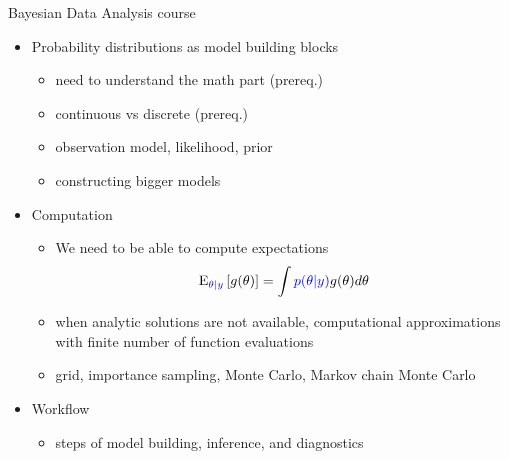\documentclass[english,t]{beamer}
\newcommand{\E}{\mathrm{E}}
\begin{document}
\begin{frame}{Bayesian Data Analysis course}

  \begin{itemize}
  \item Probability distributions as model building blocks
    \begin{itemize}
    \item need to understand the math part (prereq.)
    \item continuous vs discrete (prereq.)
    \item observation model, likelihood, prior
    \item constructing bigger models
    \end{itemize}
  \item<2-> Computation
    \begin{itemize}
    \item 
  We need to be able to compute expectations%
  \begin{align*}
    \E_{\color{blue}{\theta|y}}\left[ g(\theta) \right] = \int {\color{blue}p(\theta|y)}g(\theta) d\theta
  \end{align*}
    \item when analytic solutions are not available, computational
      approximations with finite number of function evaluations
    \item grid, importance sampling, Monte Carlo, Markov chain Monte Carlo
    \end{itemize}
  \item<3-> Workflow
    \begin{itemize}
    \item steps of model building, inference, and diagnostics
    \end{itemize}
  \end{itemize}
  
\end{frame}
\end{document}
